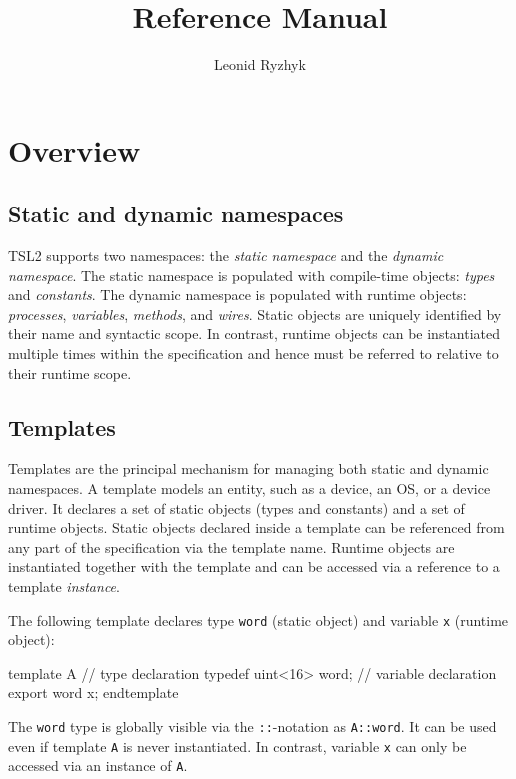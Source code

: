 \documentclass{report}
\author{Leonid Ryzhyk}
\title{\tsl Reference Manual}
\newcommand{\src}[1]{\texttt{#1}}
\newcommand{\tsl}{TSL2 }
\begin{document}
\maketitle

\tableofcontents

\chapter{Overview}

\section{Static and dynamic namespaces}\label{s:o:namespace}

\tsl supports two namespaces: the \emph{static namespace} and the 
\emph{dynamic namespace}.  The static namespace is populated with 
compile-time objects: \emph{types} and \emph{constants}.  The 
dynamic namespace is populated with runtime objects: 
\emph{processes}, \emph{variables}, \emph{methods}, and 
\emph{wires}.  Static objects are uniquely identified by their 
name and syntactic scope.  In contrast, runtime objects can be 
instantiated multiple times within the specification and hence 
must be referred to relative to their runtime scope.  

\section{Templates}\label{s:o:templates}

Templates are the principal mechanism for managing both static and 
dynamic namespaces.  A template models an entity, such as a 
device, an OS, or a device driver.  It declares a set of static 
objects (types and constants) and a set of runtime objects.  
Static objects declared inside a template can be referenced from 
any part of the specification via the template name.  Runtime 
objects are instantiated together with the template and can be 
accessed via a reference to a template \emph{instance}.

The following template declares type \src{word} (static object) 
and variable \src{x} (runtime object):
\begin{tsllisting}{}
template A
  // type declaration
  typedef uint<16> word;
  // variable declaration
  export word x;
endtemplate
\end{tsllisting}
The \src{word} type is globally visible via the \src{::}-notation 
as \src{A::word}.  It can be used even if template \src{A} is 
never instantiated.  In contrast, variable \src{x} can only be 
accessed via an instance of \src{A}.  
\end{document}
